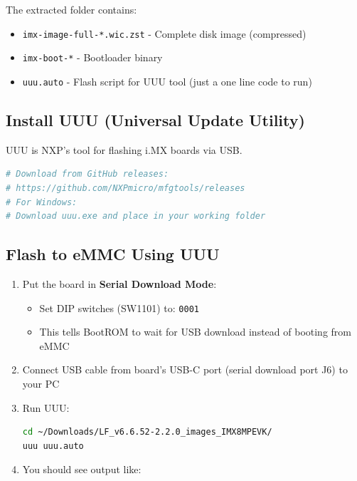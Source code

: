 \documentclass[12pt,a4paper]{report}
\begin{document}
The extracted folder contains:
\begin{itemize}
    \item \texttt{imx-image-full-*.wic.zst} - Complete disk image (compressed)
    \item \texttt{imx-boot-*} - Bootloader binary
    \item \texttt{uuu.auto} - Flash script for UUU tool (just a one line code to run)
\end{itemize}

\subsection{Install UUU (Universal Update Utility)}

UUU is NXP's tool for flashing i.MX boards via USB.

\begin{lstlisting}[language=bash]
# Download from GitHub releases:
# https://github.com/NXPmicro/mfgtools/releases
# For Windows:
# Download uuu.exe and place in your working folder
\end{lstlisting}

\subsection{Flash to eMMC Using UUU}

\begin{enumerate}
    \item Put the board in \textbf{Serial Download Mode}:
    \begin{itemize}
        \item Set DIP switches (SW1101) to: \texttt{0001}
        \item This tells BootROM to wait for USB download instead of booting from eMMC
    \end{itemize}
    
    \item Connect USB cable from board's USB-C port (serial download port J6) to your PC
    
    \item Run UUU:
    \begin{lstlisting}[language=bash]
cd ~/Downloads/LF_v6.6.52-2.2.0_images_IMX8MPEVK/
uuu uuu.auto
    \end{lstlisting}
    
    \item You should see output like:
\end{enumerate}
\end{document}
